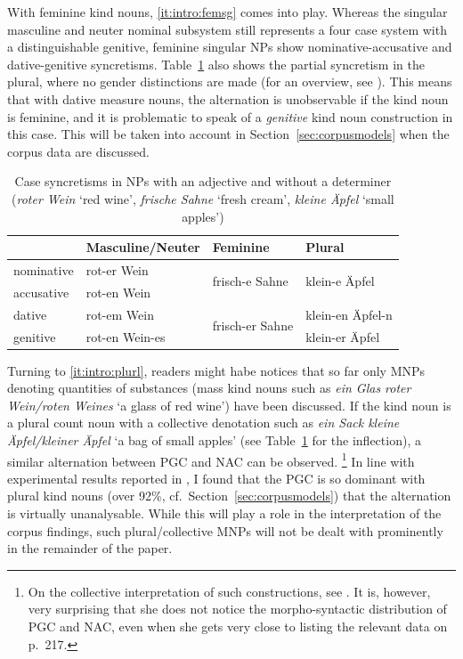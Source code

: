 \documentclass[USenglish]{article}
\begin{document}
With feminine kind nouns, \ref{it:intro:femsg} comes into play.
Whereas the singular masculine and neuter nominal subsystem still represents a four case system with a distinguishable genitive, feminine singular NPs show nominative-accusative and dative-genitive syncretisms.
Table~\ref{tab:syncretisms} also shows the partial syncretism in the plural, where no gender distinctions are made (for an overview, see \citealp[XYZ]{Eisenberg2013a}).
This means that with dative measure nouns, the alternation is unobservable if the kind noun is feminine, and it is problematic to speak of a \textit{genitive} kind noun construction in this case.
This will be taken into account in Section~\ref{sec:corpusmodels} when the corpus data are discussed.

\begin{table}
  \centering
  \begin{tabular}{llll}
     & Masculine\slash Neuter & Feminine & Plural \\
     \midrule
     nominative & rot-er Wein    & \multirow{2}{*}{frisch-e Sahne}   & \multirow{2}{*}{klein-e Äpfel} \\
     accusative & rot-en Wein    &                                   &                                \\
     dative     & rot-em Wein    & \multirow{2}{*}{frisch-er Sahne}  & klein-en Äpfel-n               \\
     genitive   & rot-en Wein-es &                                   & klein-er Äpfel                 \\
  \end{tabular}
  \caption{Case syncretisms in NPs with an adjective and without a determiner (\textit{roter Wein} `red wine', \textit{frische Sahne} `fresh cream', \textit{kleine Äpfel} `small apples')}
  \label{tab:syncretisms}
\end{table}

Turning to \ref{it:intro:plurl}, readers might habe notices that so far only MNPs denoting quantities of substances (mass kind nouns such as \textit{ein Glas roter Wein\slash roten Weines} `a glass of red wine') have been discussed.
If the kind noun is a plural count noun with a collective denotation such as \textit{ein Sack kleine Äpfel\slash kleiner Äpfel} `a bag of small apples' (see Table~\ref{tab:syncretisms} for the inflection), a similar alternation between PGC and NAC can be observed.%
\footnote{On the collective interpretation of such constructions, see \cite{Eschenbach1994}.
It is, however, very surprising that she does not notice the morpho-syntactic distribution of PGC and NAC, even when she gets very close to listing the relevant data on p.\ 217.}
In line with experimental results reported in \cite[15--16]{Zimmer2015}, I found that the PGC is so dominant with plural kind nouns (over 92\%, cf.\ Section~\ref{sec:corpusmodels}) that the alternation is virtually unanalysable.
While this will play a role in the interpretation of the corpus findings, such plural\slash collective MNPs will not be dealt with prominently in the remainder of the paper.
\end{document}
